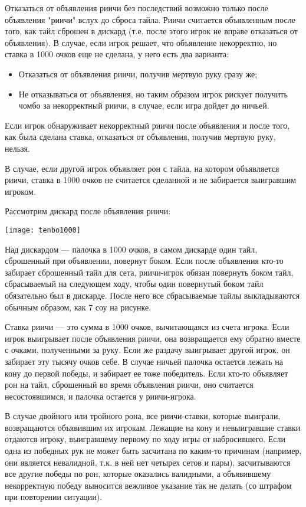 Отказаться от объявления риичи без последствий возможно только после объявления "риичи" вслух до сброса тайла. Риичи считается объявленным после того, как тайл сброшен в дискард (т.е. после этого игрок не вправе отказаться от объявления). В случае, если игрок решает, что объявление некорректно, но ставка в 1000 очков еще не сделана, у него есть два варианта:

\begin{itemize}
	\item Отказаться от объявления риичи, получив мертвую руку сразу же;
	\item Не отказываться от объявления, но таким образом игрок рискует получить чомбо за некорректный риичи, в случае, если игра дойдет до ничьей.
\end{itemize}

Если игрок обнаруживает некорректный риичи после объявления и после того, как была сделана ставка, отказаться от объявления, получив мертвую руку, нельзя.

В случае, если другой игрок объявляет рон с тайла, на котором объявляется риичи, ставка в 1000 очков не считается сделанной и не забирается выигравшим игроком.

Рассмотрим дискард после объявления риичи:

\hspace{1.3cm} \texttt{[image: tenbo1000]}



Над дискардом --- палочка в 1000 очков, в самом дискарде один тайл, сброшенный при объявлении, повернут боком. Если после объявления кто-то забирает сброшенный тайл для сета, риичи-игрок обязан повернуть боком тайл, сбрасываемый на следующем ходу, чтобы один повернутый боком тайл обязательно был в дискарде. После него все сбрасываемые тайлы выкладываются обычным образом, как 7 соу на рисунке.

Ставка риичи --- это сумма в 1000 очков, вычитающаяся из счета игрока. Если игрок выигрывает после объявления риичи, она возвращается ему обратно вместе с очками, полученными за руку. Если же раздачу выигрывает другой игрок, он забирает эту тысячу очков себе. В случае ничьей палочка остается лежать на кону до первой победы, и забирает ее тоже победитель. Если кто-то объявляет рон на тайл, сброшенный во время объявления риичи, оно считается несостоявшимся, и палочка остается у риичи-игрока.

В случае двойного или тройного рона, все риичи-ставки, которые выиграли, возвращаются объявившим их игрокам. Лежащие на кону и невыигравшие ставки отдаются игроку, выигравшему первому по ходу игры от набросившего. Если одна из победных рук не может быть засчитана по каким-то причинам (например, они является невалидной, т.к. в ней нет четырех сетов и пары), засчитываются все другие победы по рон, которые оказались валидными, а объявившему некорректную победу выносится вежливое указание так не делать (со штрафом при повторении ситуации).


